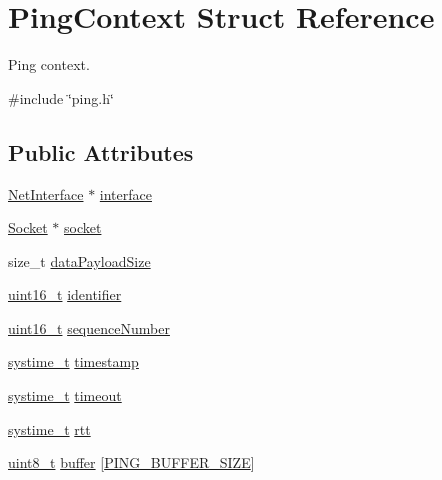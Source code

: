 \hypertarget{structPingContext}{}\section{Ping\+Context Struct Reference}
\label{structPingContext}


Ping context.  




{\ttfamily \#include \char`\"{}ping.\+h\char`\"{}}

\subsection*{Public Attributes}
\begin{DoxyCompactItemize}
\item 
\hyperlink{net_8h_a2234db8911a1148c9159979d8f5e0d6b}{Net\+Interface} $\ast$ \hyperlink{structPingContext_a073a54777f8695b78d92e4dd1e65f50f}{interface}
\item 
\hyperlink{socket_8h_aa85acfb0fa336ef495e6ba87fb88fc48}{Socket} $\ast$ \hyperlink{structPingContext_a7350625b099ef9d224098259f713dc80}{socket}
\item 
size\+\_\+t \hyperlink{structPingContext_ae06fb21c6e63db031f631068a10d546f}{data\+Payload\+Size}
\item 
\hyperlink{stdint_8h_a273cf69d639a59973b6019625df33e30}{uint16\+\_\+t} \hyperlink{structPingContext_a589a580b784d48c631cc623957872fbd}{identifier}
\item 
\hyperlink{stdint_8h_a273cf69d639a59973b6019625df33e30}{uint16\+\_\+t} \hyperlink{structPingContext_ab01b982ba9fd139a366a34a7ff3deda1}{sequence\+Number}
\item 
\hyperlink{compiler__port_8h_ae3e32a98d431a02106616da3071832dd}{systime\+\_\+t} \hyperlink{structPingContext_a0da9c1f437ccff2b8084a2f8f76d2766}{timestamp}
\item 
\hyperlink{compiler__port_8h_ae3e32a98d431a02106616da3071832dd}{systime\+\_\+t} \hyperlink{structPingContext_a54b3e386313823853f73dc5d6ec1758c}{timeout}
\item 
\hyperlink{compiler__port_8h_ae3e32a98d431a02106616da3071832dd}{systime\+\_\+t} \hyperlink{structPingContext_a0849999bf979c232761d6cd831278822}{rtt}
\item 
\hyperlink{stdint_8h_aba7bc1797add20fe3efdf37ced1182c5}{uint8\+\_\+t} \hyperlink{structPingContext_aed5669c080545d5f0ef2d655d08bf685}{buffer} \mbox{[}\hyperlink{ping_8h_a01bcde96ad86fbab0faceac74cfb9c19}{P\+I\+N\+G\+\_\+\+B\+U\+F\+F\+E\+R\+\_\+\+S\+I\+ZE}\mbox{]}
\end{DoxyCompactItemize}


